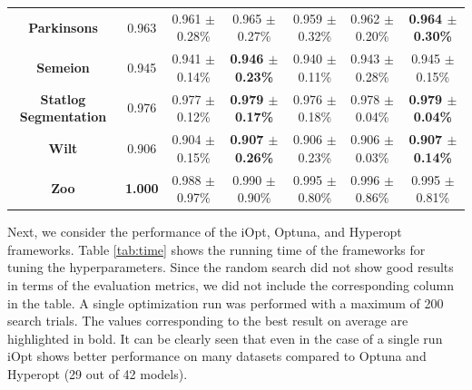 \documentclass[preprint,12pt]{elsarticle}
\begin{document}
\begin{table}
{\begin{tabular}{ccccccc}
\textbf{Parkinsons}             & {\color[HTML]{FE0000} 0.963}          & 0.961 $\pm$ 0.28\%                                 & 0.965 $\pm$ 0.27\%                                 & 0.959 $\pm$ 0.32\%                                 & 0.962 $\pm$ 0.20\%                                 & \textbf{0.964 $\pm$ 0.30\%}                        \\
\textbf{Semeion}                & {\color[HTML]{FE0000} 0.945}          & 0.941 $\pm$ 0.14\%                                 & \textbf{0.946 $\pm$ 0.23\%}                        & 0.940 $\pm$ 0.11\%                                 & 0.943 $\pm$ 0.28\%                                 & 0.945 $\pm$ 0.15\%                                 \\
\textbf{Statlog   Segmentation} & 0.976                                 & 0.977 $\pm$ 0.12\%                                 & \textbf{0.979 $\pm$ 0.17\%}                        & 0.976 $\pm$ 0.18\%                                 & 0.978 $\pm$ 0.04\%                                 & {\color[HTML]{FE0000} \textbf{0.979 $\pm$ 0.04\%}} \\
\textbf{Wilt}                   & {\color[HTML]{FE0000} 0.906}          & 0.904 $\pm$ 0.15\%                                 & \textbf{0.907 $\pm$ 0.26\%}                        & 0.906 $\pm$ 0.23\%                                 & 0.906 $\pm$ 0.03\%                                 & \textbf{0.907 $\pm$ 0.14\%}                        \\
\textbf{Zoo}                    & {\color[HTML]{FE0000} \textbf{1.000}} & 0.988 $\pm$ 0.97\%                                 & 0.990 $\pm$ 0.90\%                                 & 0.995 $\pm$ 0.80\%                                 & 0.996 $\pm$ 0.86\%                                 & 0.995 $\pm$ 0.81\%                                 \\ \hline
\end{tabular}%
}
\end{table}


Next, we consider the performance of the iOpt, Optuna, and Hyperopt frameworks. Table \ref{tab:time} shows the running time of the frameworks for tuning the hyperparameters.
Since the random search did not show good results in terms of the evaluation metrics, we did not include the corresponding column in the table. 
A single optimization run was performed with a maximum of 200 search trials. The values corresponding to the best result on average are highlighted in bold. It can be clearly seen that even in the case of a single run iOpt shows better performance on many datasets compared to Optuna and Hyperopt (29 out of 42 models).
\end{document}
